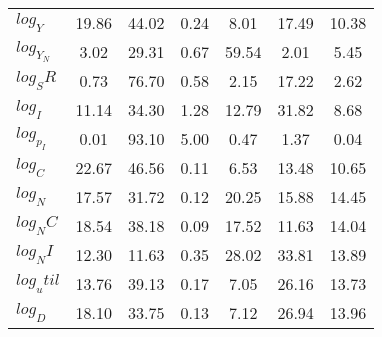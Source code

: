 \begin{center}
\begin{longtable}{lcccccc}
$log_Y     $	 & 	       19.86	 & 	       44.02	 & 	        0.24	 & 	        8.01	 & 	       17.49	 & 	       10.38 \\ 
$log_Y_N   $	 & 	        3.02	 & 	       29.31	 & 	        0.67	 & 	       59.54	 & 	        2.01	 & 	        5.45 \\ 
$log_SR    $	 & 	        0.73	 & 	       76.70	 & 	        0.58	 & 	        2.15	 & 	       17.22	 & 	        2.62 \\ 
$log_I     $	 & 	       11.14	 & 	       34.30	 & 	        1.28	 & 	       12.79	 & 	       31.82	 & 	        8.68 \\ 
$log_p_I   $	 & 	        0.01	 & 	       93.10	 & 	        5.00	 & 	        0.47	 & 	        1.37	 & 	        0.04 \\ 
$log_C     $	 & 	       22.67	 & 	       46.56	 & 	        0.11	 & 	        6.53	 & 	       13.48	 & 	       10.65 \\ 
$log_N     $	 & 	       17.57	 & 	       31.72	 & 	        0.12	 & 	       20.25	 & 	       15.88	 & 	       14.45 \\ 
$log_NC    $	 & 	       18.54	 & 	       38.18	 & 	        0.09	 & 	       17.52	 & 	       11.63	 & 	       14.04 \\ 
$log_NI    $	 & 	       12.30	 & 	       11.63	 & 	        0.35	 & 	       28.02	 & 	       33.81	 & 	       13.89 \\ 
$log_util  $	 & 	       13.76	 & 	       39.13	 & 	        0.17	 & 	        7.05	 & 	       26.16	 & 	       13.73 \\ 
$log_D     $	 & 	       18.10	 & 	       33.75	 & 	        0.13	 & 	        7.12	 & 	       26.94	 & 	       13.96 \\ 
\end{longtable}
 \end{center}
